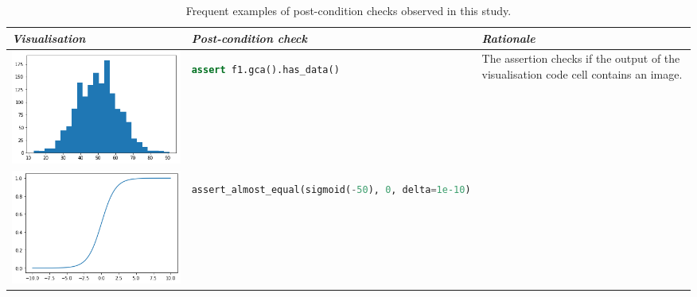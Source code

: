 \documentclass[acmsmall,screen,review,anonymous]{acmart}
\begin{document}
\begin{table}
\centering
\caption{Frequent examples of post-condition checks observed in this study.}
\begin{tabular}{p{} p{} p{}}
\toprule
\emph{\textbf{Visualisation}}&
\emph{\textbf{Post-condition check}}&
\emph{\textbf{Rationale}}\\
\midrule
\includegraphics[width=\linewidth]{post-cond-01.png}&
\begin{lstlisting}[language=Python]
assert f1.gca().has_data()
\end{lstlisting}&
The assertion checks if the output of the visualisation code cell contains an image.\\
\includegraphics[width=\linewidth]{post-cond-02.png}&
\begin{lstlisting}[language=Python]
assert_almost_equal(sigmoid(-50), 0, delta=1e-10)

\end{lstlisting}
\end{tabular}
\end{table}
\end{document}
